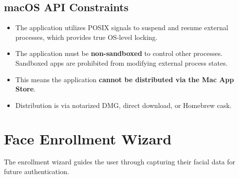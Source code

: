 \documentclass[12pt,a4paper]{report}
\begin{document}
\subsection{macOS API Constraints}
\begin{itemize}[noitemsep]
    \item The application utilizes POSIX signals to suspend and resume external processes, which provides true OS-level locking.
    \item The application must be \textbf{non-sandboxed} to control other processes. Sandboxed apps are prohibited from modifying external process states.
    \item This means the application \textbf{cannot be distributed via the Mac App Store}.
    \item Distribution is via notarized DMG, direct download, or Homebrew cask.
\end{itemize}

\section{Face Enrollment Wizard}
The enrollment wizard guides the user through capturing their facial data for future authentication.
\end{document}
